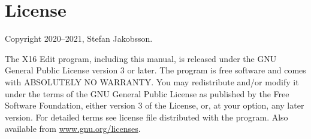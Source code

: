 \documentclass{article}
\begin{document}
\section{License}

	Copyright 2020--2021, Stefan Jakobsson.

	The X16 Edit program, including this manual, is released under the GNU General Public License version 3 or later.
    The program is free software and comes with ABSOLUTELY NO WARRANTY. You may redistribute and/or modify it under the 
    terms of the GNU General Public License as pub­lished by the Free Software Foundation, either version 3 of the License, 
    or, at your option, any later version. For detailed terms see license file distributed with the program. 
    Also available from \href{https://www.gnu.org/licenses}{www.gnu.org/licenses}.
\end{document}
